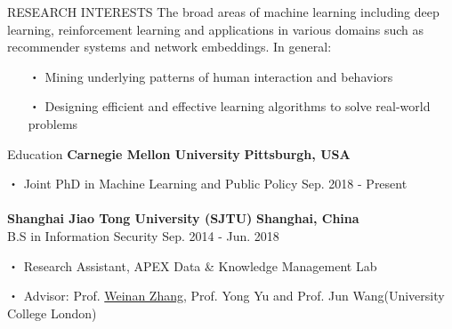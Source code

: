 \documentclass{resume} %
\begin{document}
\vspace{-1em}
\begin{rSection}{RESEARCH INTERESTS}
The broad areas of machine learning including deep learning, reinforcement learning and applications in various domains such as recommender systems and network embeddings. In general:
\begin{itemize}[itemindent=-5mm] 
	\itemsep=-5pt
	\vspace*{-5pt}
	\item[・] Mining underlying patterns of human interaction and behaviors
	\item[・] Designing efficient and effective learning algorithms to solve real-world problems
\end{itemize}
\end{rSection}


\begin{rSection}{Education}
\textbf{Carnegie Mellon University} \hfill \textbf{Pittsburgh, USA}
\vspace{-5pt}
\item[・]Joint PhD in Machine Learning and Public Policy \hfill Sep. 2018 - Present \\ \\
\textbf{Shanghai Jiao Tong University (SJTU)} \hfill \textbf{Shanghai, China}\\ %
B.S in Information Security \hfill Sep. 2014 - Jun. 2018
\vspace{-5pt}
\item[・] Research Assistant, APEX Data \& Knowledge Management Lab
\vspace{-5pt}
\item[・] Advisor: Prof. \href{http://wnzhang.net}{Weinan Zhang}, Prof. Yong Yu and Prof. Jun Wang(University College London)
\end{rSection}
\end{document}
